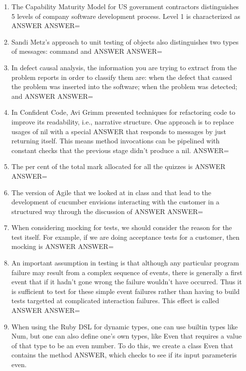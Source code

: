 \documentclass{exam}
\begin{document}
\begin{enumerate}
\item The Capability Maturity Model for US government contractors distinguishes 5 levels of company software development process.  Level 1 is characterized as ANSWER\newline
ANSWER=
\item Sandi Metz's approach to unit testing of objects also distinguishes two types of messages: command and ANSWER\newline
ANSWER=
\item In defect causal analysis, the information you are trying to extract from the problem reports in order to classify them are: when the defect that caused the problem was inserted into the software; when the problem was detected; and ANSWER\newline
ANSWER=
\item In Confident Code, Avi Grimm presented techniques for refactoring code to improve its readability, i.e., narrative structure.  One approach is to replace usages of nil with a special ANSWER that responds to messages by just returning itself.  This means method invocations can be pipelined with constant checks that the previous stage didn't produce a nil.\newline
ANSWER=
\item The per cent of the total mark allocated for all the quizzes is ANSWER\newline
ANSWER=
\item The version of Agile that we looked at in class and that lead to the development of cucumber envisions interacting with the customer in a structured way through the discussion of ANSWER\newline
ANSWER=
\item When considering mocking for tests, we should consider the reason for the test itself.  For example, if we are doing acceptance tests for a customer, then mocking is ANSWER\newline
ANSWER=
\item An important assumption in testing is that although any particular program failure may result from a complex sequence of events, there is generally a first event that if it hadn't gone wrong the failure wouldn't have occurred.  Thus it is sufficient to test for these simple event failures rather than having to build tests targetted at complicated interaction failures.  This effect is called ANSWER \newline
ANSWER=
\item When using the Ruby DSL for dynamic types, one can use builtin types like Num, but one can also define one's own types, like Even that requires a value of that type to be an even number.  To do this, we create a class Even that contains the method ANSWER, which checks to see if its input parameteris even.\newline

\end{enumerate}
\end{document}
